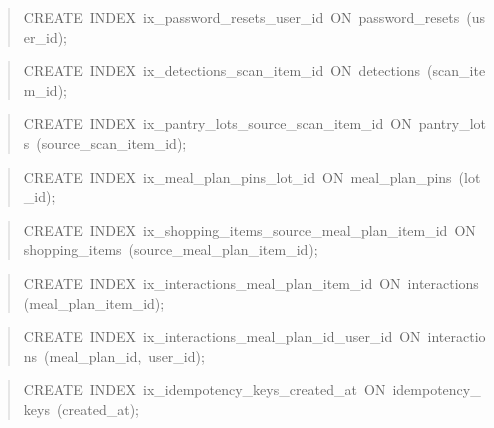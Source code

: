 \begin{quote}\scriptsize\ttfamily\raggedright
CREATE\ INDEX\ ix\_\allowbreak{}password\_\allowbreak{}resets\_\allowbreak{}user\_\allowbreak{}id\ ON\ password\_\allowbreak{}resets\ (user\_\allowbreak{}id);
\end{quote}
\begin{quote}\scriptsize\ttfamily\raggedright
CREATE\ INDEX\ ix\_\allowbreak{}detections\_\allowbreak{}scan\_\allowbreak{}item\_\allowbreak{}id\ ON\ detections\ (scan\_\allowbreak{}item\_\allowbreak{}id);
\end{quote}
\begin{quote}\scriptsize\ttfamily\raggedright
CREATE\ INDEX\ ix\_\allowbreak{}pantry\_\allowbreak{}lots\_\allowbreak{}source\_\allowbreak{}scan\_\allowbreak{}item\_\allowbreak{}id\ ON\ pantry\_\allowbreak{}lots\ (source\_\allowbreak{}scan\_\allowbreak{}item\_\allowbreak{}id);
\end{quote}
\begin{quote}\scriptsize\ttfamily\raggedright
CREATE\ INDEX\ ix\_\allowbreak{}meal\_\allowbreak{}plan\_\allowbreak{}pins\_\allowbreak{}lot\_\allowbreak{}id\ ON\ meal\_\allowbreak{}plan\_\allowbreak{}pins\ (lot\_\allowbreak{}id);
\end{quote}
\begin{quote}\scriptsize\ttfamily\raggedright
CREATE\ INDEX\ ix\_\allowbreak{}shopping\_\allowbreak{}items\_\allowbreak{}source\_\allowbreak{}meal\_\allowbreak{}plan\_\allowbreak{}item\_\allowbreak{}id\ ON\ shopping\_\allowbreak{}items\ (source\_\allowbreak{}meal\_\allowbreak{}plan\_\allowbreak{}item\_\allowbreak{}id);
\end{quote}
\begin{quote}\scriptsize\ttfamily\raggedright
CREATE\ INDEX\ ix\_\allowbreak{}interactions\_\allowbreak{}meal\_\allowbreak{}plan\_\allowbreak{}item\_\allowbreak{}id\ ON\ interactions\ (meal\_\allowbreak{}plan\_\allowbreak{}item\_\allowbreak{}id);
\end{quote}
\begin{quote}\scriptsize\ttfamily\raggedright
CREATE\ INDEX\ ix\_\allowbreak{}interactions\_\allowbreak{}meal\_\allowbreak{}plan\_\allowbreak{}id\_\allowbreak{}user\_\allowbreak{}id\ ON\ interactions\ (meal\_\allowbreak{}plan\_\allowbreak{}id,\ user\_\allowbreak{}id);
\end{quote}
\begin{quote}\scriptsize\ttfamily\raggedright
CREATE\ INDEX\ ix\_\allowbreak{}idempotency\_\allowbreak{}keys\_\allowbreak{}created\_\allowbreak{}at\ ON\ idempotency\_\allowbreak{}keys\ (created\_\allowbreak{}at);
\end{quote}
